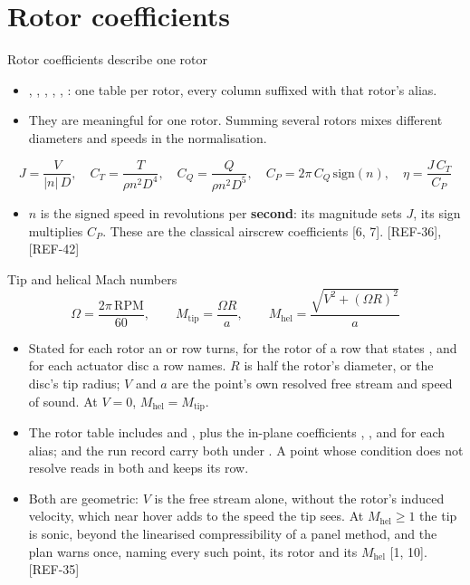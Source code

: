 %
\section{Rotor coefficients}

\begin{frame}{Rotor coefficients describe one rotor}
\begin{itemize}
  \item {}, , , , , :
        one table per rotor, every column suffixed with that rotor's alias.
  \item They are meaningful for one rotor. Summing several rotors mixes
        different diameters and speeds in the normalisation.
\end{itemize}
\[
  J = \frac{V}{|n|\,D}, \quad
  C_T = \frac{T}{\rho n^2 D^4}, \quad
  C_Q = \frac{Q}{\rho n^2 D^5}, \quad
  C_P = 2\pi\,C_Q\,\mathrm{sign}(n), \quad
  \eta = \frac{J\,C_T}{C_P}
\]
\begin{itemize}\small
  \item \(n\) is the signed speed in revolutions per \textbf{second}: its
        magnitude sets \(J\), its sign multiplies \(C_P\). These are the
        classical airscrew coefficients [6, 7]. [REF-36], [REF-42]
\end{itemize}
\end{frame}

\begin{frame}{Tip and helical Mach numbers}
\[ \Omega = \frac{2\pi\,\mathrm{RPM}}{60}, \qquad
   M_\mathrm{tip} = \frac{\Omega R}{a}, \qquad
   M_\mathrm{hel} = \frac{\sqrt{V^2 + (\Omega R)^2}}{a} \]
\begin{itemize}\small
  \item Stated for each rotor an  or
         row turns, for the rotor of a  row
        that states , and for each actuator disc a row names. \(R\) is half the rotor's diameter, or the
        disc's tip radius; \(V\) and \(a\) are the point's own resolved free
        stream and speed of sound. At \(V = 0\), \(M_\mathrm{hel} =
        M_\mathrm{tip}\).
  \item The rotor table includes  and
        , plus the in-plane coefficients
        , ,  and  for each alias;  and the run record carry both
        under . A point whose condition does not resolve
        reads  in both and keeps its row.
  \item Both are geometric: \(V\) is the free stream alone, without the
        rotor's induced velocity, which near hover adds to the speed the tip
        sees. At \(M_\mathrm{hel} \ge 1\) the tip is sonic, beyond the
        linearised compressibility of a panel method, and the plan warns
        once, naming every such point, its rotor and its \(M_\mathrm{hel}\)
        [1, 10]. [REF-35]
\end{itemize}
\end{frame}

